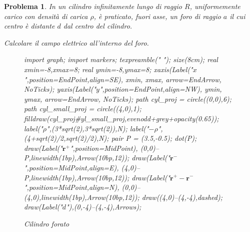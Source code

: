 \documentclass[a4paper,oneside]{article}
\newtheorem{problema}{Problema}
\let\oldhat\hat
\renewcommand{\vec}[1]{\mathbf{#1}}
\renewcommand{\hat}[1]{\widehat{\mathbf{#1}}}
\begin{document}
\begin{problema}
	In un cilindro infinitamente lungo di raggio $R$, uniformemente carico
	con densità di carica $\rho$, è praticato, fuori asse, un foro di raggio $a$
	il cui centro è distante $d$ dal centro del cilindro.
	
	Calcolare il campo elettrico all'interno del foro.
	\begin{figure}
		\centering
		\begin{asy}
			import graph;
			import markers;
			texpreamble("\let\oldhat\hat
			\renewcommand{\vec}[1]{\mathbf{#1}}
			\renewcommand{\hat}[1]{\oldhat{\mathbf{#1}}}");
			size(8cm);
			real xmin=-8,xmax=8;
			real ymin=-8,ymax=8;
			xaxis(Label("\small $x$",position=EndPoint,align=SE),
			xmin, xmax, arrow=EndArrow, NoTicks);
			yaxis(Label("\small $y$",position=EndPoint,align=NW),
			ymin, ymax, arrow=EndArrow, NoTicks);
			path cyl_proj = circle((0,0),6);
			path cyl_small_proj = circle((4,0),1);
			filldraw(cyl_proj^^cyl_small_proj,evenodd+grey+opacity(0.65));
			label("$\rho$",(3*sqrt(2),3*sqrt(2)),N);
			label("$-\rho$",(4+sqrt(2)/2,sqrt(2)/2),N);
			pair P = (3.5,-0.5);
			dot(P);
			draw(Label("\small $\vec{r^+}$",position=MidPoint),
			(0,0)--P,linewidth(1bp),Arrow(10bp,12));
			draw(Label("\small $\vec{r^-}$",position=MidPoint,align=E),
			(4,0)--P,linewidth(1bp),Arrow(10bp,12));
			draw(Label("\small $\vec{r^+-r^-}$",position=MidPoint,align=N),
			(0,0)--(4,0),linewidth(1bp),Arrow(10bp,12));	
			draw((4,0)--(4,-4),dashed);
			draw(Label("\small $d$"),(0,-4)--(4,-4),Arrows);
		\end{asy}
		\caption{Cilindro forato}
		\label{fig:cilindro_forato}
	\end{figure}
\end{problema}
\end{document}
